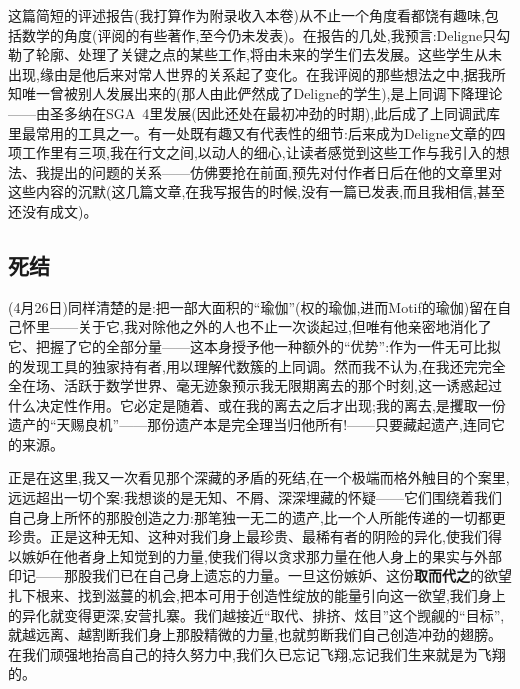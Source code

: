 这篇简短的评述报告(我打算作为附录收入本卷)从不止一个角度看都饶有趣味,包括数学的角度(评阅的有些著作,至今仍未发表)。在报告的几处,我预言:Deligne只勾勒了轮廓、处理了关键之点的某些工作,将由未来的学生们去发展。这些学生从未出现,缘由是他后来对常人世界的关系起了变化。在我评阅的那些想法之中,据我所知\dmark{}唯一曾被别人发展出来的(那人由此俨然成了Deligne的学生),是上同调下降理论——由圣多纳在SGA~4里发展(因此还处在最初冲劲的时期),此后成了上同调武库里最常用的工具之一。有一处既有趣又有代表性的细节:后来成为Deligne文章的四项工作里有三项,我在行文之间,以动人的细心,让读者感觉到这些工作与我引入的想法、我提出的问题的关系——仿佛要抢在前面,预先对付作者日后在他的文章里对这些内容的沉默(这几篇文章,在我写报告的时候,没有一篇已发表,而且我相信,甚至还没有成文)。

\subsection{死结}


(4月26日)同样清楚的是:把一部大面积的“瑜伽”(权的瑜伽,进而Motif的瑜伽)留在自己怀里——关于它,我对除他之外的人也不止一次谈起过,但唯有他亲密地消化了它、把握了它的全部分量——这本身授予他一种额外的“优势”:作为一件无可比拟的发现工具的独家持有者,用以理解代数簇的上同调。然而我不认为,在我还完完全全在场、活跃于数学世界、毫无迹象预示我无限期离去的那个时刻,这一诱惑起过什么决定性作用。它必定是随着、或在我的离去之后才出现;我的离去,是攫取一份遗产的“天赐良机”——那份遗产本是完全理当归他所有!——只要藏起遗产,连同它的来源。

正是在这里,我又一次看见那个深藏的矛盾的死结,在一个极端而格外触目的个案里,远远超出一切个案:我想谈的是无知、不屑、深深埋藏的怀疑——它们围绕着我们自己身上所怀的那股创造之力:那笔独一无二的遗产,比一个人所能传递的一切都更珍贵。正是这种无知、这种对我们身上最珍贵、最稀有者的阴险的异化\dmark{},使我们得以嫉妒在他者身上知觉到的力量,使我们得以贪求那力量在他人身上的果实与外部印记——那股我们已在自己身上遗忘的力量。一旦这份嫉妒、这份\textbf{取而代之}的欲望扎下根来、找到滋蔓的机会,把本可用于创造性绽放的能量引向这一欲望,我们身上的异化就变得更深,安营扎寨。我们越接近“取代、排挤、炫目”这个觊觎的“目标”,就越远离、越割断我们身上那股精微的力量,也就剪断我们自己创造冲劲的翅膀。在我们顽强地抬高自己的持久努力中,我们久已忘记飞翔,忘记我们生来就是为飞翔的。

